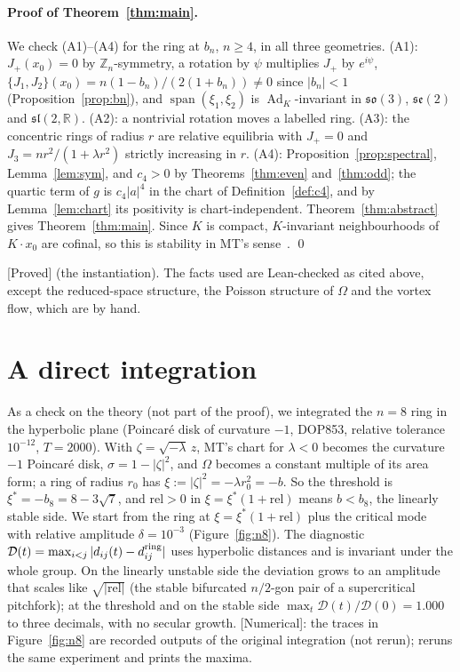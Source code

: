 \documentclass[11pt]{article}
\numberwithin{equation}{section}
\theoremstyle{definition}
\theoremstyle{remark}
\newcommand{\R}{\mathbb{R}}
\newcommand{\Z}{\mathbb{Z}}
\DeclareRobustCommand{\code}[1]{\path{#1}}
\newcommand{\status}[1]{\textsf{[#1]}}
\begin{document}
\paragraph{Proof of Theorem~\ref{thm:main}.} We check (A1)--(A4) for the ring at $b_n$, $n\ge4$, in all three
geometries. (A1): $J_+(x_0)=0$ by $\Z_n$-symmetry, a rotation by $\psi$ multiplies $J_+$ by $e^{i\psi}$,
$\{J_1,J_2\}(x_0)=n(1-b_n)/(2(1+b_n))\ne0$ since $|b_n|<1$ (Proposition~\ref{prop:bn}), and
$\operatorname{span}(\xi_1,\xi_2)$ is $\operatorname{Ad}_K$-invariant in $\mathfrak{so}(3)$, $\mathfrak{se}(2)$
and $\mathfrak{sl}(2,\R)$. (A2): a nontrivial rotation moves a labelled ring. (A3): the concentric rings
of radius $r$ are relative equilibria with $J_+=0$ and $J_3=nr^2/(1+\lambda r^2)$ strictly increasing in
$r$. (A4): Proposition~\ref{prop:spectral}, Lemma~\ref{lem:sym}, and $c_4>0$ by Theorems~\ref{thm:even}
and~\ref{thm:odd}; the quartic term of $g$ is $c_4|a|^4$ in the chart of Definition~\ref{def:c4}, and by
Lemma~\ref{lem:chart} its positivity is chart-independent. Theorem~\ref{thm:abstract} gives
Theorem~\ref{thm:main}. Since $K$ is compact, $K$-invariant neighbourhoods of $K\cdot x_0$ are cofinal,
so this is stability in MT's sense~\cite[p.~10]{MT}. \qed

\noindent\status{Proved} (the instantiation). The facts used are Lean-checked as cited above, except the
reduced-space structure, the Poisson structure of $\Omega$ and the vortex flow, which are by hand.

\section{A direct integration}\label{sec:numerics}

As a check on the theory (not part of the proof), we integrated the $n=8$ ring in the hyperbolic plane
(Poincar\'e disk of curvature $-1$, DOP853, relative tolerance $10^{-12}$, $T=2000$). With $\zeta=\sqrt{-\lambda}\,z$,
MT's chart for $\lambda<0$ becomes the curvature $-1$ Poincar\'e disk, $\sigma=1-|\zeta|^2$, and $\Omega$ becomes a
constant multiple of its area form; a ring of radius $r_0$ has $\xi:=|\zeta|^2=-\lambda r_0^2=-b$. So the
threshold is $\xi^*=-b_8=8-3\sqrt7$, and $\mathrm{rel}>0$ in $\xi=\xi^*(1+\mathrm{rel})$ means $b<b_8$, the
linearly stable side. We start from the ring at $\xi=\xi^*(1+\mathrm{rel})$ plus the critical mode with relative
amplitude $\delta=10^{-3}$ (Figure~\ref{fig:n8}). The diagnostic $\mathcal D(t)=\max_{i<j}|d_{ij}(t)-d_{ij}^{\rm ring}|$ uses hyperbolic
distances and is invariant under the whole group. On the linearly unstable side the deviation grows to an
amplitude that scales like $\sqrt{|\mathrm{rel}|}$ (the stable bifurcated $n/2$-gon pair of a supercritical
pitchfork); at the threshold and on the stable side $\max_t\mathcal D(t)/\mathcal D(0)=1.000$ to three decimals, with no
secular growth. \status{Numerical}: the traces in Figure~\ref{fig:n8} are recorded outputs of the original
integration (not rerun); \code{code/n8_integration.py} reruns the same experiment and prints the maxima.
\end{document}
